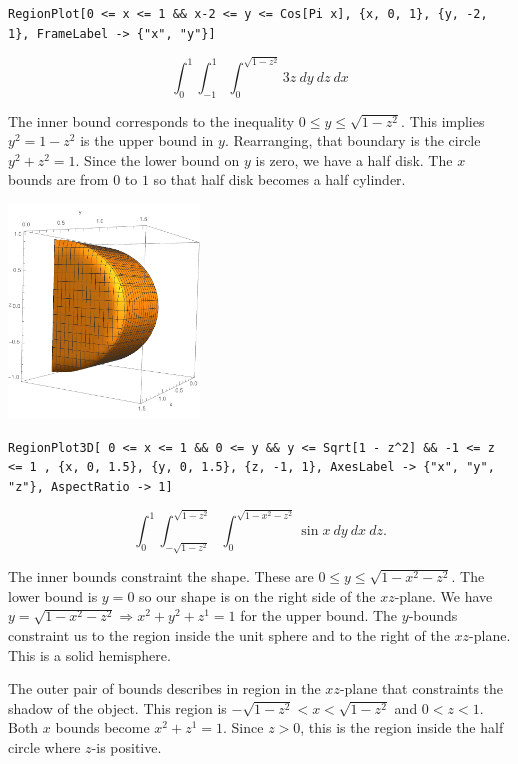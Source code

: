 \documentclass[12pt,letterpaper,noanswers]{exam}
\begin{document}
\begin{questions}
\begin{parts}
\begin{solution}
\texttt{RegionPlot[0 <= x <= 1 \&\& x-2 <= y <= Cos[Pi x], \{x, 0, 1\}, \{y, -2, 1\}, 
 FrameLabel -> \{"x", "y"\}]}
\end{solution}

\item \[\int_0^1\int_{-1}^1\int_0^{\sqrt{1-z^2}} 3z\ dy\ dz\ dx\]
\begin{solution}
The inner bound corresponds to the inequality $0\leq y \leq \sqrt{1-z^2}$.  This implies $y^2 = 1-z^2$ is the upper bound in $y$.  Rearranging, that boundary is the circle $y^2+z^2 =1$.  Since the lower bound on $y$ is zero, we have a half disk.  The $x$ bounds are from $0$ to $1$ so that half disk becomes a half cylinder.

\includegraphics[width=2in]{img/HW06_r6.pdf}

\texttt{RegionPlot3D[
 0 <= x <= 1 \&\& 0 <= y \&\& y <= Sqrt[1 - z\^{}2] \&\& -1 <= z <= 1 , \{x, 0, 
  1.5\}, \{y, 0, 1.5\}, \{z, -1, 1\}, AxesLabel -> \{"x", "y", "z"\}, 
 AspectRatio -> 1]}

\end{solution}



\item \[\int_0^1\int_{-\sqrt{1-z^2}}^{\sqrt{1-z^2}}\int_0^{\sqrt{1-x^2-z^2}} \sin x\ dy\ dx\ dz.\]

\begin{solution}

The inner bounds constraint the shape.  These are $0\leq y\leq \sqrt{1-x^2-z^2}$.  The lower bound is $y=0$ so our shape is on the right side of the $xz$-plane.  We have $y = \sqrt{1-x^2-z^2} \Rightarrow x^2+y^2+z^1 = 1$ for the upper bound.  The $y$-bounds constraint us to the region inside the unit sphere and to the right of the $xz$-plane.  This is a solid hemisphere.

The outer pair of bounds describes in region in the $xz$-plane that constraints the shadow of the object.  This region is $-\sqrt{1-z^2}<x<\sqrt{1-z^2}$ and $0<z<1$.  Both $x$ bounds become $x^2+z^1 = 1$.  Since $z>0$, this is the region inside the half circle where $z$-is positive.


\end{solution}
\end{parts}
\end{questions}
\end{document}
